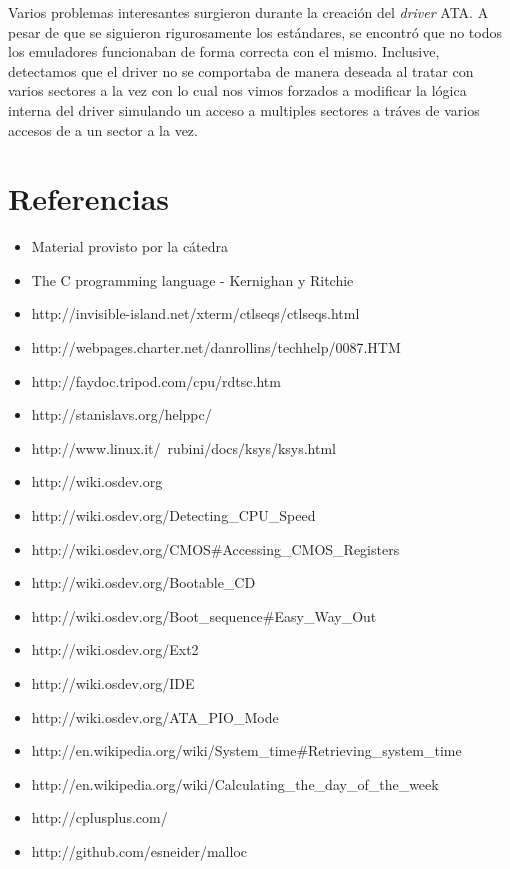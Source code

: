 \documentclass[a4paper,10pt]{article}
\begin{document}
Varios problemas interesantes surgieron durante la creación del \textit{driver} ATA. A pesar de que se siguieron
rigurosamente los estándares, se encontró que no todos los emuladores funcionaban de forma correcta con el mismo.
Inclusive, detectamos que el driver no se comportaba de manera deseada al tratar con varios sectores a la vez con lo
cual nos vimos forzados a modificar la lógica interna del driver simulando un acceso a multiples sectores a tráves de
varios accesos de a un sector a la vez.

\newpage     
\section{Referencias}

\begin{itemize}
  \item Material provisto por la cátedra
  \item The C programming language - Kernighan y Ritchie
  \item http://invisible-island.net/xterm/ctlseqs/ctlseqs.html
  \item http://webpages.charter.net/danrollins/techhelp/0087.HTM
  \item http://faydoc.tripod.com/cpu/rdtsc.htm
  \item http://stanislavs.org/helppc/
  \item http://www.linux.it/~rubini/docs/ksys/ksys.html
  \item http://wiki.osdev.org
  \item http://wiki.osdev.org/Detecting\_CPU\_Speed
  \item	http://wiki.osdev.org/CMOS\#Accessing\_CMOS\_Registers
  \item http://wiki.osdev.org/Bootable\_CD
  \item http://wiki.osdev.org/Boot\_sequence\#Easy\_Way\_Out
  \item http://wiki.osdev.org/Ext2
  \item http://wiki.osdev.org/IDE
  \item http://wiki.osdev.org/ATA\_PIO\_Mode
  \item http://en.wikipedia.org/wiki/System\_time\#Retrieving\_system\_time
  \item http://en.wikipedia.org/wiki/Calculating\_the\_day\_of\_the\_week
  \item http://cplusplus.com/
  \item http://github.com/esneider/malloc
\end{itemize}
   
\end{document}
